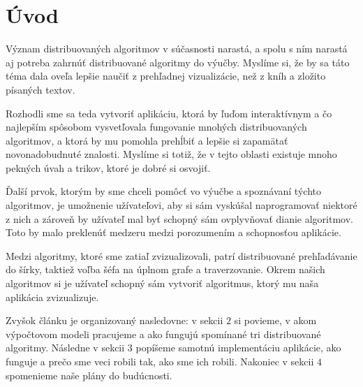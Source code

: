 \section{Úvod}

Význam distribuovaných algoritmov v súčasnosti narastá, a spolu s ním narastá aj potreba
zahrnúť distribuované algoritmy do výučby. Myslíme si, že by sa táto téma dala oveľa lepšie naučiť
z prehľadnej vizualizácie, než z kníh a zložito písaných textov.

Rozhodli sme sa teda vytvoriť aplikáciu, ktorá by ľuďom interaktívnym a čo najlepším spôsobom
vysvetľovala fungovanie mnohých distribuovaných algoritmov, a ktorá by mu pomohla prehĺbiť a lepšie si zapamätať
novonadobudnuté znalosti. Myslíme si totiž, že v tejto oblasti existuje mnoho pekných úvah a trikov,
ktoré je dobré si osvojiť. 

Ďalší prvok, ktorým by sme chceli pomôcť vo výučbe a spoznávaní týchto algoritmov, je umožnenie užívateľovi, 
aby si sám vyskúšal naprogramovať niektoré z nich a zároveň by užívateľ mal byť schopný sám
ovplyvňovať dianie algoritmov. Toto by malo preklenúť medzeru medzi porozumením a schopnosťou
aplikácie.

Medzi algoritmy, ktoré sme zatiaľ zvizualizovali, patrí distribuované prehľadávanie do šírky,
taktiež voľba šéfa na úplnom grafe a traverzovanie. Okrem našich algoritmov si je užívateľ schopný
sám vytvoriť algoritmus, ktorý mu naša aplikácia zvizualizuje.

Zvyšok článku je organizovaný nasledovne: v sekcii $2$ si povieme, v akom výpočtovom modeli
pracujeme a ako fungujú spomínané tri distribuované algoritmy. 
Následne v sekcii $3$ popíšeme samotnú implementáciu aplikácie, ako
funguje a prečo sme veci robili tak, ako sme ich robili. Nakoniec v sekcii $4$ spomenieme naše plány do budúcnosti.
